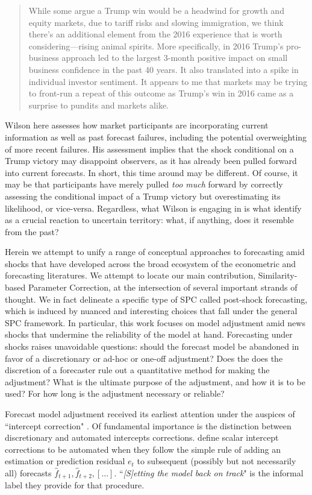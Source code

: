 \documentclass[11pt]{article}
\theoremstyle{definition}
\begin{document}
\begin{quote}While some argue a Trump win would be a headwind for growth and equity markets, due to tariff  risks and slowing immigration, we think there's an additional element from the 2016 experience that  is worth considering—rising animal spirits. More specifically, in 2016 Trump's pro-business approach  led to the largest 3-month positive impact on small business confidence in the past 40 years. It also translated into a spike in individual investor sentiment. It appears to me that markets may be trying  to front-run a repeat of this outcome as Trump's win in 2016 came as a surprise to pundits and  markets alike.
\end{quote}
Wilson here assesses how market participants are incorporating current information as well as past forecast failures, including the potential overweighting of more recent failures.  His assessment implies that the shock conditional on a Trump victory may disappoint observers, as it has already been pulled forward into current forecasts.  In short, this time around may be different.  Of course, it may be that participants have merely pulled \textit{too much} forward by correctly assessing the conditional impact of a Trump victory but overestimating its likelihood, or vice-versa.  Regardless, what Wilson is engaging in is what \cite{lundquist2024volatility} identify as a crucial reaction to uncertain territory: what, if anything, does it resemble from the past?

Herein we attempt to unify a range of conceptual approaches to forecasting amid shocks that have developed across the broad ecosystem of the econometric and forecasting literatures.  We attempt to locate our main contribution, Similarity-based Parameter Correction, at the intersection of several important strands of thought.  We in fact delineate a specific type of SPC called post-shock forecasting, which is induced by nuanced and interesting choices that fall under the general SPC framework.  In particular, this work focuses on model adjustment amid news shocks that undermine the reliability of the  model at hand.  Forecasting under shocks raises unavoidable questions: should the forecast model be abandoned in favor of a discretionary or ad-hoc or one-off adjustment?  Does the does the discretion of a forecaster rule out a quantitative method for making the adjustment?  What is the ultimate purpose of the adjustment, and how it is to be used?  For how long is the adjustment necessary or reliable?

Forecast model adjustment received its earliest attention under the auspices of ``intercept correction" \citep{hendry1994theory,clements1996intercept,clements1998forecasting, clements1999forecasting}.  Of fundamental importance is the distinction between discretionary and automated intercepts corrections. \cite{hendry1994theory} define scalar intercept corrections to be automated when they follow the simple rule of adding an estimation or prediction residual $e_{t}$ to subsequent (possibly but not necessarily all) forecasts $\hat f_{t+1},\hat f_{t+2},[...].$ ``\textit{[S]etting the model back on track}" is the informal label they provide for that procedure. 
 
\end{document}

